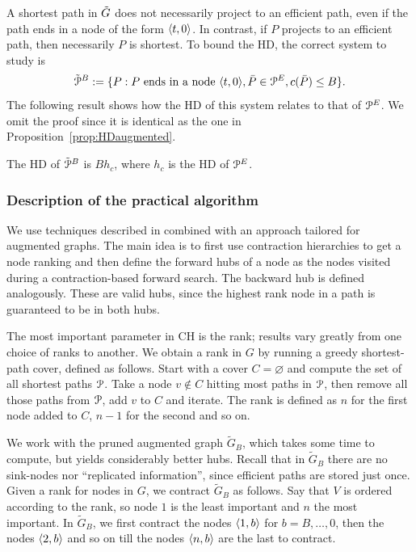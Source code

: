 A shortest path in $\tilde G$ does not necessarily project to an efficient path, even if the path ends in a node of the form $\langle t,0\rangle$.
In contrast, if $P$ projects to an efficient path, then necessarily $P$ is shortest. 
To bound the HD, the correct system to study is
\[
\tilde{\mathcal{P}}^B:=\{P: P\text{ ends in a node }\langle t,0\rangle, \bar P\in \mathcal{P}^E, c(\bar P)\leq B \}.
\]
The following result shows how the HD of this system relates to that of $\mathcal{P}^E$.
We omit the proof since it is identical as the one in Proposition~\ref{prop:HDaugmented}.
\begin{proposition}
The HD of $\tilde{\mathcal{P}}^B$ is $Bh_c$, where $h_c$ is the HD of $\mathcal{P}^E$.
\end{proposition}

\subsubsection{Description of the practical algorithm}

We use techniques described in \cite{hubimplem} combined with an approach tailored for augmented graphs.
The main idea is to first use contraction hierarchies to get a node ranking and then define the forward hubs of a node as the nodes visited during a contraction-based forward search.
The backward hub is defined analogously.
These are valid hubs, since the highest rank node in a path is guaranteed to be in both hubs.

The most important parameter in CH is the rank; results vary greatly from one choice of ranks to another.
We obtain a rank in $G$ by running a greedy shortest-path cover, defined as follows.
Start with a cover $C=\varnothing$ and compute the set of all shortest paths $\mathcal{P}$.
Take a node $v\notin C$ hitting most paths in $\mathcal{P}$, then remove all those paths from $\mathcal{P}$, add $v$ to $C$ and iterate.
The rank is defined as $n$ for the first node added to $C$, $n-1$ for the second and so on.

We work with the pruned augmented graph $\tilde G_B$, which takes some time to compute, but yields considerably better hubs. 
Recall that in $\tilde G_B$ there are no sink-nodes nor ``replicated information'', since efficient paths are stored just once.
Given a rank for nodes in $G$, we contract $\tilde G_B$ as follows.
Say that $V$ is ordered according to the rank, so node $1$ is the least important and $n$ the most important.
In $\tilde G_B$, we first contract the nodes $\langle1,b\rangle$ for $b=B,\ldots,0$, then the nodes $\langle2,b\rangle$ and so on till the nodes $\langle n,b\rangle$ are the last to contract. 

